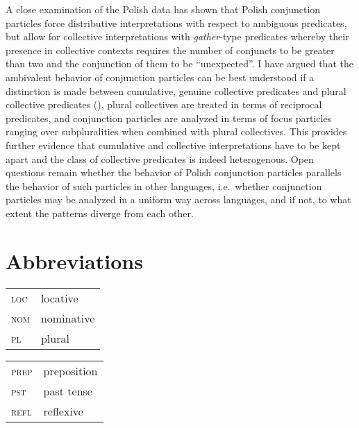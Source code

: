 \documentclass[output=paper]{langscibook}
\begin{document}
A close examination of the Polish data has shown that Polish conjunction particles force distributive interpretations with respect to ambiguous predicates, but allow for collective interpretations with \textit{gather}-type predicates whereby their presence in collective contexts requires the number of conjuncts to be greater than two and the conjunction of them to be ``unexpected''. I have argued that the ambivalent behavior of conjunction particles can be best understood if a distinction is made between cumulative, genuine collective predicates and plural collective predicates (\citealt{Dowty:1987, Winter:2002, Hackl:2002, Champollion:2010}), plural collectives are treated in terms of reciprocal predicates, and conjunction particles are analyzed in terms of focus particles ranging over subpluralities when combined with plural collectives. This provides further evidence that cumulative and collective interpretations have to be kept apart and the class of collective predicates is indeed heterogenous. Open questions remain whether the behavior of Polish conjunction particles parallels the behavior of such particles in other languages, i.e.~whether conjunction particles may be analyzed in a uniform way across languages, and if not, to what extent the patterns diverge from each other.

\section*{Abbreviations}

\begin{tabularx}{.5\textwidth}{@{}lX@{}}
    \textsc{loc} & locative\\
    \textsc{nom} & nominative \\
    \textsc{pl} & plural \\
        \end{tabularx}%
    \begin{tabularx}{.5\textwidth}{@{}lX@{}}
        \textsc{prep} & preposition \\
        \textsc{pst} & past tense \\
        \textsc{refl} & reflexive \\
\end{tabularx}
    
\end{document}
